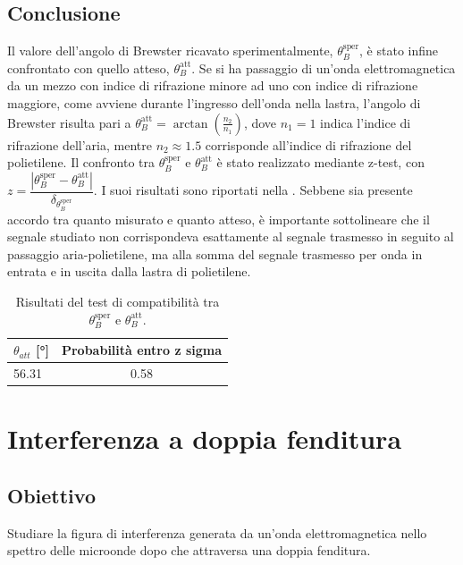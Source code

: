 \documentclass[a4paper]{article}
\begin{document}
\subsection{Conclusione}
Il valore dell'angolo di Brewster ricavato sperimentalmente, $\theta_B^{\text{sper}}$, è stato infine confrontato con quello atteso, $\theta_B^{\text{att}}$. Se si ha passaggio di un'onda elettromagnetica da un mezzo con indice di rifrazione minore ad uno con indice di rifrazione maggiore, come avviene durante l'ingresso dell'onda nella lastra, l'angolo di Brewster risulta pari a $\theta_B^{\text{att}} = \arctan\left(\frac{n_2}{n_1}\right)$, dove $n_1 = 1$ indica l'indice di rifrazione dell'aria, mentre $n_2 \approx 1.5$ corrisponde all'indice di rifrazione del polietilene. Il confronto tra $\theta_B^{\text{sper}}$ e $\theta_B^{\text{att}}$ è stato realizzato mediante z-test, con $z = \dfrac{|\theta_B^{\text{sper}} - \theta_B^{\text{att}}|}{\delta_{\theta_B^{\text{sper}}}}$. I suoi risultati sono riportati nella . Sebbene sia presente accordo tra quanto misurato e quanto atteso, è importante sottolineare che il segnale studiato non corrispondeva esattamente al segnale trasmesso in seguito al passaggio aria-polietilene, ma alla somma del segnale trasmesso per onda in entrata e in uscita dalla lastra di polietilene.
\begin{table}[htbp] 
\centering
\caption{Risultati del test di compatibilità tra $\theta_B^{\text{sper}}$ e $\theta_B^{\text{att}}$.}
\label{tab:brewster_compatibilita}
\begin{tabular}{|l|c|}
\hline
$\theta_{att}$ [\si{\degree}] & Probabilità entro z sigma \\
\hline
56.31 & 0.58 \\
\bottomrule
\end{tabular}
\end{table}


\section{Interferenza a doppia fenditura}
\subsection{Obiettivo}
Studiare la figura di interferenza generata da un'onda elettromagnetica nello spettro delle microonde dopo che attraversa una doppia fenditura.
\end{document}
